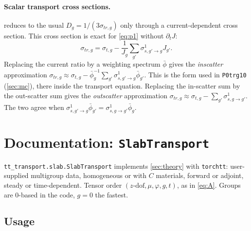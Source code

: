 \documentclass[11pt,a4paper]{article}
\newcommand{\code}[1]{\texttt{#1}}
\begin{document}
\paragraph{Scalar transport cross sections.}  reduces to the usual $D_g=1/(3\sigma_{tr,g})$ only through a current-dependent cross section. This cross section is exact for \eqref{eq:p1} without $\partial_tJ$:
\begin{equation}
\sigma_{tr,g}=\sigma_{t,g}-\frac{1}{J_g}\sum_{g'}\sigma^{1}_{s,g'\to g}J_{g'} .
\end{equation}
Replacing the current ratio by a weighting spectrum $\bar\phi$ gives the \emph{inscatter} approximation $\sigma_{tr,g}\approx\sigma_{t,g}-\bar\phi_g^{-1}\sum_{g'}\sigma^1_{s,g'\to g}\bar\phi_{g'}$. This is the form used in \code{P0trg10} (\cref{sec:mc}), there inside the transport equation. Replacing the in-scatter sum by the out-scatter sum gives the \emph{outscatter} approximation $\sigma_{tr,g}\approx\sigma_{t,g}-\sum_{g'}\sigma^1_{s,g\to g'}$. The two agree when $\sigma^1_{s,g'\to g}\bar\phi_{g'}=\sigma^1_{s,g\to g'}\bar\phi_g$.

\section{Documentation: \texttt{SlabTransport}}
\label{sec:docs}

\code{tt\_transport.slab.SlabTransport} implements \cref{sec:theory} with \code{torchtt}: user-supplied multigroup data, homogeneous or with $C$ materials, forward or adjoint, steady or time-dependent. Tensor order $(z\text{-dof},\mu,\varphi,g,t)$, as in \eqref{eq:A}. Groups are 0-based in the code, $g=0$ the fastest.

\subsection{Usage}
\end{document}

